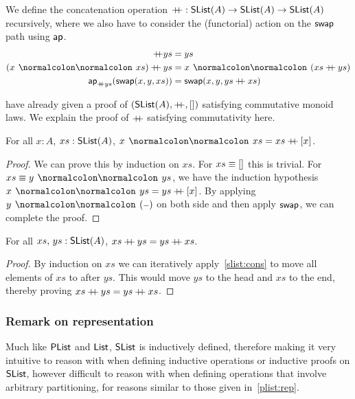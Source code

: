 \begin{definition}[Concatenation]
    We define the concatenation operation $\mathbin{+\kern -0.4em+} : \operatorname{\mathsf{SList}}(A) \to \operatorname{\mathsf{SList}}(A) \to \operatorname{\mathsf{SList}}(A)$
    recursively, where we also have to consider the (functorial) action on the $\operatorname{\mathsf{swap}}$ path using $\operatorname{\mathsf{ap}}$.
    \begin{align*}
        [] \concat ys                                 & = ys                               \\
        (x \cons xs) \concat ys                       & = x \cons (xs \concat ys)          \\
        \term{ap}_{\concat ys}(\term{swap}(x, y, xs)) & = \term{swap}(x, y, ys \concat xs)
    \end{align*}
\end{definition}

\cite{choudhuryFreeCommutativeMonoids2023} have already given a proof of $(\operatorname{\mathsf{SList}}(A), \mathbin{+\kern -0.4em+}, [])$ satisfying
commutative monoid laws. We explain the proof of $\mathbin{+\kern -0.4em+}$ satisfying commutativity here.

\begin{lemma}\label{slist:cons}
    For all $x : A$, $xs : \operatorname{\mathsf{SList}}(A)$, $x \cons xs = xs \concat [ x ]$.
\end{lemma}

\begin{proof}
    We can prove this by induction on $xs$.
    For $xs \mathrel{\equiv} []$ this is trivial. For $xs \jdgeq y \cons ys$, we have the induction hypothesis $x \cons ys = ys \concat [ x ]$.
    By applying $y \cons (\blank)$ on both side and then apply $\operatorname{\mathsf{swap}}$, we can complete the proof.
\end{proof}

\begin{theorem}[Commutativity]\label{slist:comm}
    For all $xs,\,ys : \operatorname{\mathsf{SList}}(A)$, $xs \mathbin{+\kern -0.4em+} ys = ys \mathbin{+\kern -0.4em+} xs$.
\end{theorem}

\begin{proof}
    By induction on $xs$ we can iteratively apply~\cref{slist:cons} to move all elements of $xs$
    to after $ys$. This would move $ys$ to the head and $xs$ to the end, thereby proving
    $xs \mathbin{+\kern -0.4em+} ys = ys \mathbin{+\kern -0.4em+} xs$.
\end{proof}

\subsubsection*{Remark on representation}\label{slist:rep}
Much like $\operatorname{\mathsf{PList}}$ and $\operatorname{\mathsf{List}}$, $\operatorname{\mathsf{SList}}$ is inductively defined, therefore making it very intuitive to reason
with when defining inductive operations or inductive proofs on $\operatorname{\mathsf{SList}}$, however difficult to reason with
when defining operations that involve arbitrary partitioning, for reasons similar to those given
in~\cref{plist:rep}.

